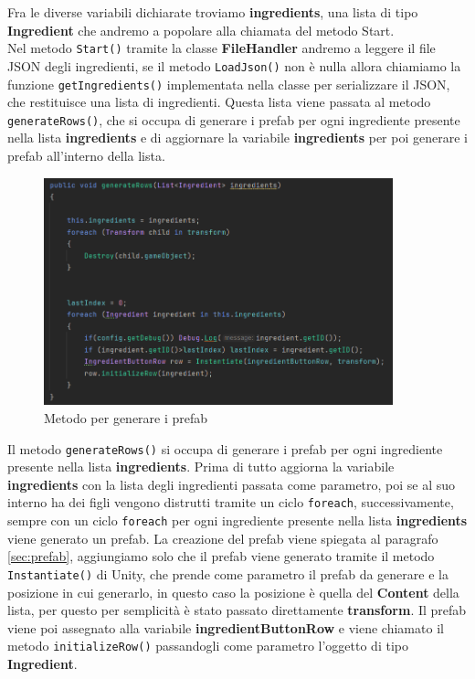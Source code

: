 Fra le diverse variabili dichiarate troviamo \textbf{ingredients}, una lista di tipo \textbf{Ingredient} che andremo a popolare alla chiamata del metodo Start. \\
Nel metodo \texttt{Start()} tramite la classe \textbf{FileHandler} andremo a leggere il file JSON degli ingredienti, se il metodo \texttt{LoadJson()} non è nulla allora chiamiamo la funzione \texttt{getIngredients()} implementata nella classe per serializzare il JSON, che restituisce una lista di ingredienti. Questa lista viene passata al metodo \texttt{generateRows()}, che si occupa di generare i prefab per ogni ingrediente presente nella lista \textbf{ingredients} e di aggiornare la variabile \textbf{ingredients} per poi generare i prefab all'interno della lista.
\begin{figure}[H]
    \centering
    \includegraphics[width=0.9\textwidth,height=\textheight,keepaspectratio]{figures/chapter_1/generateRows_CODICE.png}
    \caption{Metodo per generare i prefab}
    \label{fig:generateRows}
\end{figure}
Il metodo \texttt{generateRows()} si occupa di generare i prefab per ogni ingrediente presente nella lista \textbf{ingredients}. Prima di tutto aggiorna la variabile \textbf{ingredients} con la lista degli ingredienti passata come parametro, poi se al suo interno ha dei figli vengono distrutti tramite un ciclo \texttt{foreach}, successivamente, sempre con un ciclo \texttt{foreach} per ogni ingrediente presente nella lista \textbf{ingredients} viene generato un prefab. La creazione del prefab viene spiegata al paragrafo \ref{sec:prefab}, aggiungiamo solo che il prefab viene generato tramite il metodo \texttt{Instantiate()} di Unity, che prende come parametro il prefab da generare e la posizione in cui generarlo, in questo caso la posizione è quella del \textbf{Content} della lista, per questo per semplicità è stato passato direttamente \textbf{transform}. Il prefab viene poi assegnato alla variabile \textbf{ingredientButtonRow} e viene chiamato il metodo \texttt{initializeRow()} passandogli come parametro l'oggetto di tipo \textbf{Ingredient}.


